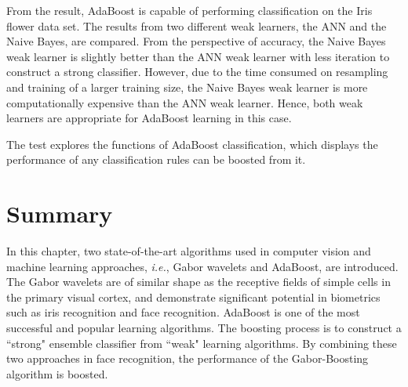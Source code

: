% 
From the result, AdaBoost is capable of performing classification on the Iris flower data set. The results from two different weak learners, the ANN and the Naive Bayes, are compared. From the perspective of accuracy, the Naive Bayes weak learner is slightly better than the ANN weak learner with less iteration to construct a strong classifier. However, due to the time consumed on resampling and training of a larger training size, the Naive Bayes weak learner is more computationally expensive than the ANN weak learner. Hence, both weak learners are appropriate for AdaBoost learning in this case.

The test explores the functions of AdaBoost classification, which displays the performance of any classification rules can be boosted from it.

\section{Summary}
In this chapter, two state-of-the-art algorithms used in computer vision and machine learning approaches, \textit{i.e.}, Gabor wavelets and AdaBoost, are introduced. The Gabor wavelets are of similar shape as the receptive fields of simple cells in the primary visual cortex, and demonstrate significant potential in biometrics such as iris recognition and face recognition. AdaBoost is one of the most successful and popular learning algorithms. The boosting process is to construct a ``strong" ensemble classifier from ``weak" learning algorithms. By combining these two approaches in face recognition, the performance of the Gabor-Boosting algorithm is boosted.